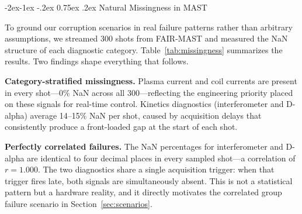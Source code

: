 \documentclass[10pt,twocolumn]{article}
\makeatletter
\renewcommand\subsection{\@startsection{subsection}{2}{\z@}%
  {-2ex\@plus -1ex \@minus -.2ex}%
  {0.75ex \@plus .2ex}%
  {\normalfont\large\bfseries}}
\makeatother
\begin{document}
\subsection{Natural Missingness in MAST}
\label{sec:missingness}

To ground our corruption scenarios in real failure patterns rather than
arbitrary assumptions, we streamed 300 shots from FAIR-MAST and measured
the NaN structure of each diagnostic category.
Table~\ref{tab:missingness} summarizes the results. Two findings shape
everything that follows.

\textbf{Category-stratified missingness.} Plasma current and coil
currents are present in every shot—0\% NaN across all 300—reflecting
the engineering priority placed on these signals for real-time control.
Kinetics diagnostics (interferometer and D-alpha) average 14--15\% NaN
per shot, caused by acquisition delays that consistently produce a
front-loaded gap at the start of each shot.

\textbf{Perfectly correlated failures.} The NaN percentages for
interferometer and D-alpha are identical to four decimal places in every
sampled shot—a correlation of $r = 1.000$. The two diagnostics share
a single acquisition trigger: when that trigger fires late, both signals
are simultaneously absent. This is not a statistical pattern but a
hardware reality, and it directly motivates the correlated group failure
scenario in Section~\ref{sec:scenarios}.

\begin{table}[H]
\centering
\caption{Natural NaN characterization across 300 sampled MAST shots.
Front block = single contiguous gap at start of shot.}
\label{tab:missingness}
\footnotesize
{}
\end{table}
\end{document}

